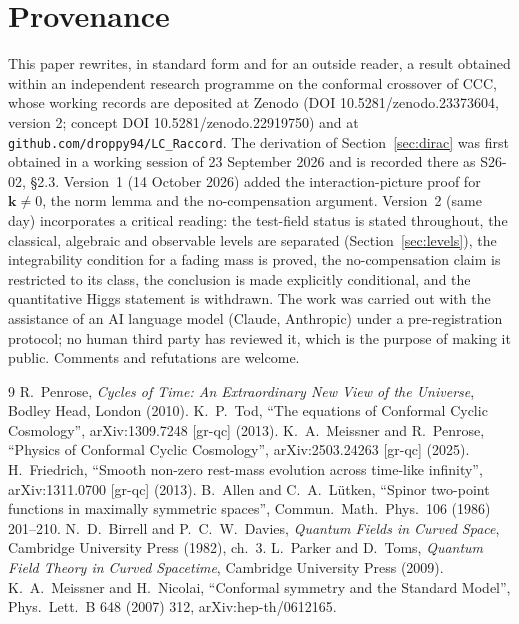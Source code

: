 \documentclass[11pt,a4paper]{article}
\theoremstyle{definition}
\begin{document}
\section*{Provenance}
This paper rewrites, in standard form and for an outside reader, a result obtained within an independent research programme on the conformal crossover of CCC, whose working records are deposited at Zenodo (DOI 10.5281/zenodo.23373604, version 2; concept DOI 10.5281/zenodo.22919750) and at \texttt{github.com/droppy94/LC\_Raccord}. The derivation of Section~\ref{sec:dirac} was first obtained in a working session of 23 September 2026 and is recorded there as S26-02, \S2.3. Version~1 (14 October 2026) added the interaction-picture proof for $\mathbf{k}\neq0$, the norm lemma and the no-compensation argument. Version~2 (same day) incorporates a critical reading: the test-field status is stated throughout, the classical, algebraic and observable levels are separated (Section~\ref{sec:levels}), the integrability condition for a fading mass is proved, the no-compensation claim is restricted to its class, the conclusion is made explicitly conditional, and the quantitative Higgs statement is withdrawn. The work was carried out with the assistance of an AI language model (Claude, Anthropic) under a pre-registration protocol; no human third party has reviewed it, which is the purpose of making it public. Comments and refutations are welcome.

\begin{thebibliography}{9}
 R.~Penrose, \emph{Cycles of Time: An Extraordinary New View of the Universe}, Bodley Head, London (2010).
 K.~P.~Tod, ``The equations of Conformal Cyclic Cosmology'', arXiv:1309.7248 [gr-qc] (2013).
 K.~A.~Meissner and R.~Penrose, ``Physics of Conformal Cyclic Cosmology'', arXiv:2503.24263 [gr-qc] (2025).
 H.~Friedrich, ``Smooth non-zero rest-mass evolution across time-like infinity'', arXiv:1311.0700 [gr-qc] (2013).
 B.~Allen and C.~A.~L\"utken, ``Spinor two-point functions in maximally symmetric spaces'', Commun.\ Math.\ Phys.\ 106 (1986) 201--210.
 N.~D.~Birrell and P.~C.~W.~Davies, \emph{Quantum Fields in Curved Space}, Cambridge University Press (1982), ch.~3.
 L.~Parker and D.~Toms, \emph{Quantum Field Theory in Curved Spacetime}, Cambridge University Press (2009).
 K.~A.~Meissner and H.~Nicolai, ``Conformal symmetry and the Standard Model'', Phys.\ Lett.\ B 648 (2007) 312, arXiv:hep-th/0612165.
\end{thebibliography}
\end{document}
